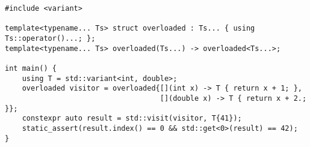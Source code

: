 \begin{lstlisting}[title=\href{https://godbolt.org/z/KM9nej}{\texttt{godbolt.org/z/KM9nej}}]
#include <variant>

template<typename... Ts> struct overloaded : Ts... { using Ts::operator()...; };
template<typename... Ts> overloaded(Ts...) -> overloaded<Ts...>;

int main() {
    using T = std::variant<int, double>;
    overloaded visitor = overloaded{[](int x) -> T { return x + 1; },
                                    [](double x) -> T { return x + 2.; }};
    constexpr auto result = std::visit(visitor, T{41});
    static_assert(result.index() == 0 && std::get<0>(result) == 42);
}
\end{lstlisting}
